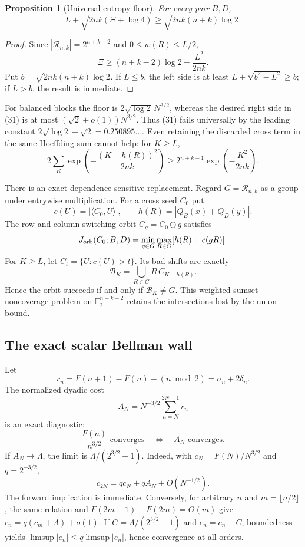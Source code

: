 \documentclass[11pt]{article}
\newtheorem{proposition}[theorem]{Proposition}
\newcommand{\Ftwo}{\mathbb F_2}
\begin{document}
\begin{proposition}[Universal entropy floor]
\label{prop:entropy-floor}
For every pair $B,D$,
\[
 L+\sqrt{2nk(\Xi+\log4)}
 \ge\sqrt{2nk(n+k)\log2}.
\]
\end{proposition}

\begin{proof}
Since $|\mathcal R_{n,k}|=2^{n+k-2}$ and $0\le w(R)\le L/2$,
\[
 \Xi\ge(n+k-2)\log2-\frac{L^2}{2nk}.
\]
Put $b=\sqrt{2nk(n+k)\log2}$.  If $L\le b$, the left side is at least
$L+\sqrt{b^2-L^2}\ge b$; if $L>b$, the result is immediate.
\end{proof}

For balanced blocks the floor is
$2\sqrt{\log2}\,N^{3/2}$, whereas the desired right side in (31) is at
most $(\sqrt2+o(1))N^{3/2}$.  Thus (31) fails universally by the leading
constant $2\sqrt{\log2}-\sqrt2=0.250895\ldots$.  Even retaining the
discarded cross term in the same Hoeffding sum cannot help: for $K\ge L$,
\[
 2\sum_R\exp\left(-\frac{(K-h(R))^2}{2nk}\right)
 \ge2^{n+k-1}\exp\left(-\frac{K^2}{2nk}\right).
\]

There is an exact dependence-sensitive replacement.  Regard
$G=\mathcal R_{n,k}$ as a group under entrywise multiplication.  For a cross
seed $C_0$ put
\[
 c(U)=|\langle C_0,U\rangle|,\qquad
 h(R)=|Q_B(x)+Q_D(y)|.
\]
The row-and-column switching orbit $C_g=C_0\odot g$ satisfies
\[
 J_{\rm orb}(C_0;B,D)
 =\min_{g\in G}\max_{R\in G}[h(R)+c(gR)].
\]
For $K\ge L$, let $C_t=\{U:c(U)>t\}$.  Its bad shifts are exactly
\[
 \mathcal B_K=\bigcup_{R\in G}R\,C_{K-h(R)}.
\]
Hence the orbit succeeds if and only if $\mathcal B_K\ne G$.  This weighted
sumset noncoverage problem on $\Ftwo^{n+k-2}$ retains the intersections lost
by the union bound.

\subsection{The exact scalar Bellman wall}

Let
\[
 r_n=F(n+1)-F(n)-(n\bmod2)=\sigma_n+2\delta_n.
\]
The normalized dyadic cost
\[
 A_N=N^{-3/2}\sum_{n=N}^{2N-1}r_n
\]
is an exact diagnostic:
\[
 \frac{F(n)}{n^{3/2}}\text{ converges}
 \quad\Longleftrightarrow\quad A_N\text{ converges}.
\]
If $A_N\to\Lambda$, the limit is
$\Lambda/(2^{3/2}-1)$.  Indeed, with
$c_N=F(N)/N^{3/2}$ and $q=2^{-3/2}$,
\[
 c_{2N}=qc_N+qA_N+O(N^{-1/2}).
\]
The forward implication is immediate.  Conversely, for arbitrary $n$ and
$m=\lfloor n/2\rfloor$, the same relation and
$F(2m+1)-F(2m)=O(m)$ give
$c_n=q(c_m+\Lambda)+o(1)$.  If
$C=\Lambda/(2^{3/2}-1)$ and $e_n=c_n-C$, boundedness yields
$\limsup|e_n|\le q\limsup|e_n|$, hence convergence at all orders.
\end{document}
